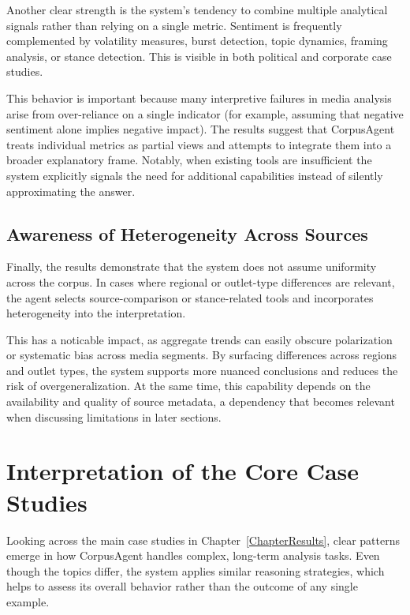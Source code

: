 Another clear strength is the system’s tendency to combine multiple analytical signals rather than relying on a single metric. Sentiment is frequently complemented by volatility measures, burst detection, topic dynamics, framing analysis, or stance detection. This is visible in both political and corporate case studies.

This behavior is important because many interpretive failures in media analysis arise from over-reliance on a single indicator (for example, assuming that negative sentiment alone implies negative impact). The results suggest that CorpusAgent treats individual metrics as partial views and attempts to integrate them into a broader explanatory frame. Notably, when existing tools are insufficient the system explicitly signals the need for additional capabilities instead of silently approximating the answer.

\subsection{Awareness of Heterogeneity Across Sources}

Finally, the results demonstrate that the system does not assume uniformity across the corpus. In cases where regional or outlet-type differences are relevant, the agent selects source-comparison or stance-related tools and incorporates heterogeneity into the interpretation.

This has a noticable impact, as aggregate trends can easily obscure polarization or systematic bias across media segments. By surfacing differences across regions and outlet types, the system supports more nuanced conclusions and reduces the risk of overgeneralization. At the same time, this capability depends on the availability and quality of source metadata, a dependency that becomes relevant when discussing limitations in later sections.


\section{Interpretation of the Core Case Studies}

Looking across the main case studies in Chapter~\ref{ChapterResults}, clear patterns emerge in how CorpusAgent handles complex, long-term analysis tasks. Even though the topics differ, the system applies similar reasoning strategies, which helps to assess its overall behavior rather than the outcome of any single example.

